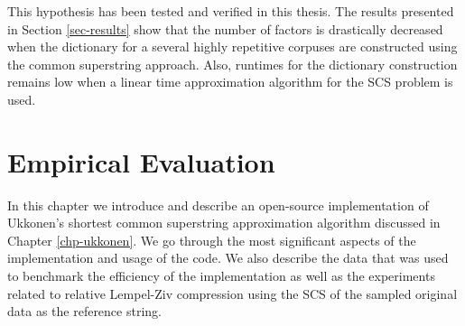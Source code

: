 \documentclass[english,twoside,censored,csm,algorithms-track-2020]{HYthesisML}
\theoremstyle{plain}
\theoremstyle{definition}
\begin{document}
This hypothesis has been tested and verified in this thesis. The results presented in Section
\ref{sec-results} show that the number of factors is drastically decreased when the dictionary
for a several highly repetitive corpuses are constructed using the common superstring approach.
Also, runtimes for the dictionary construction remains low when a linear time approximation
algorithm for the SCS problem is used.
















\chapter{Empirical Evaluation}

In this chapter we introduce and describe an open-source implementation of Ukkonen's shortest
common superstring
approximation algorithm discussed in Chapter \ref{chp-ukkonen}. We go through the most significant
aspects of the implementation and usage of the code. We also describe the data that was used to
benchmark the efficiency of the implementation as well as the experiments related to
relative Lempel-Ziv compression using the SCS of the sampled original data as the reference string.
\end{document}
